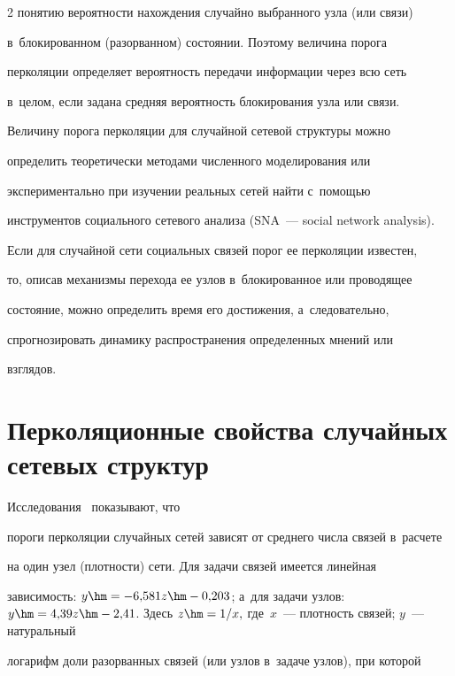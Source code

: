 \begin{multicols}{2}
понятию вероятности нахождения случайно выбранного узла (или связи) 


в~блокированном (разорванном) состоянии. Поэтому величина порога 


перколяции определяет вероятность передачи информации через всю сеть 


в~целом, если задана средняя вероятность блокирования узла или связи.


  


  Величину порога перколяции для случайной сетевой структуры можно 


определить теоретически методами численного моделирования или 


экспериментально при изучении реальных сетей \mbox{найти} с~по\-мощью 


инструментов социального сетевого анализа (SNA~--- social network analysis).


  


  Если для случайной сети социальных связей порог ее перколяции известен, 


то, описав механизмы перехода ее узлов в~блокированное или проводящее 


состояние, можно определить время его достижения, а~следовательно, 


спрогнозировать динамику распространения определенных мнений или 


взглядов.


  


\section{Перколяционные свойства случайных сетевых структур}





  Исследования~\cite{1-hv, 10-hv, 11-hv, 12-hv, 13-hv, 14-hv} показывают, что 


пороги перколяции случайных сетей зависят от среднего числа связей в~расчете 


на один узел (плотности) сети. Для задачи связей имеется линейная 


зависимость: $y\hm= -6{,}581z\hm- 0{,}203$; а~для задачи узлов: $y\hm= 4{,}39 


z\hm- 2{,}41$. Здесь $z\hm=1/x,$ где~$x$~--- плот\-ность связей; $y$~--- натуральный 


логарифм доли разорванных связей (или узлов в~задаче узлов), при которой 



\end{multicols}
